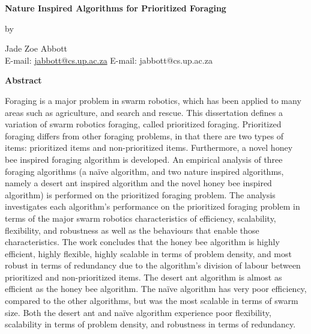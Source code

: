 
\newpage

\begin{center}
	{\large\bf Nature Inspired Algorithms for Prioritized Foraging}
\end{center}
\begin{center}by\end{center}
\begin{center}
	{Jade Zoe Abbott}\\
	\ifpdf
		E-mail: \href{mailto:jabbott@cs.up.ac.za}{jabbott@cs.up.ac.za}
	\else
		E-mail: jabbott@cs.up.ac.za
	\fi
\end{center}
\vspace{1cm}
\begin{center}{\large\bf Abstract}\end{center}


Foraging is a major problem in swarm robotics, which has been applied to many areas such as agriculture, and search and rescue. This dissertation defines a variation of swarm robotics foraging, called prioritized foraging. Prioritized foraging differs from other foraging problems, in that there are two types of items: prioritized items and non-prioritized items. Furthermore, a novel honey bee inspired foraging algorithm is developed. An empirical analysis of three foraging algorithms (a na\"ive algorithm, and two nature inspired algorithms, namely a desert ant inspired algorithm and the novel honey bee inspired algorithm) is performed on the prioritized foraging problem. The analysis investigates each algorithm's performance on the prioritized foraging problem in terms of the major swarm robotics characteristics of efficiency, scalability, flexibility, and robustness as well as the behaviours that enable those characteristics. The work concludes that the honey bee algorithm is highly efficient, highly flexible, highly scalable in terms of problem density, and most robust in terms of redundancy due to the algorithm's division of labour between prioritized and non-prioritized items. The desert ant algorithm is almost as efficient as the honey bee algorithm. The na\"ive algorithm has very poor efficiency, compared to the other algorithms, but was the most scalable in terms of swarm size. Both the desert ant and na\"ive algorithm experience poor flexibility, scalability in terms of problem density, and robustness in terms of redundancy.

\noindent\

